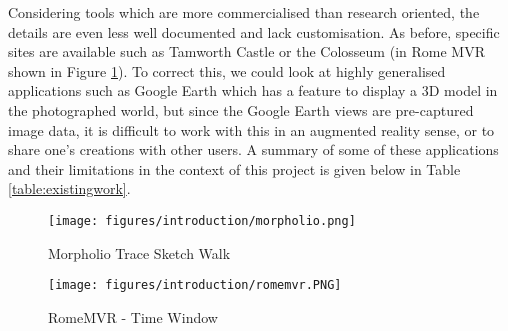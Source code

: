 \documentclass{article}
\begin{document}
Considering tools which are more commercialised than research oriented, the details are even less well documented and lack customisation. As before, specific sites are available such as Tamworth Castle or the Colosseum (in Rome MVR shown in Figure \ref{fig:romemvr}). To correct this, we could look at highly generalised applications such as Google Earth which has a feature to display a 3D model in the photographed world, but since the Google Earth views are pre-captured image data, it is difficult to work with this in an augmented reality sense, or to share one's creations with other users. A summary of some of these applications and their limitations in the context of this project is given below in Table \ref{table:existingwork}.

\begin{figure}[H]
\centering
\begin{minipage}{.5\textwidth}
  \centering
  \texttt{[image: figures/introduction/morpholio.png]}
  \caption{Morpholio Trace Sketch Walk \cite{existing:morpholio}}
  \label{fig:morpholio}
\end{minipage}%
\begin{minipage}{.5\textwidth}
  \centering
  \texttt{[image: figures/introduction/romemvr.PNG]}
  \caption{RomeMVR - Time Window \cite{existing:romemvr}}
  \label{fig:romemvr}
\end{minipage}
\end{figure}
\end{document}
